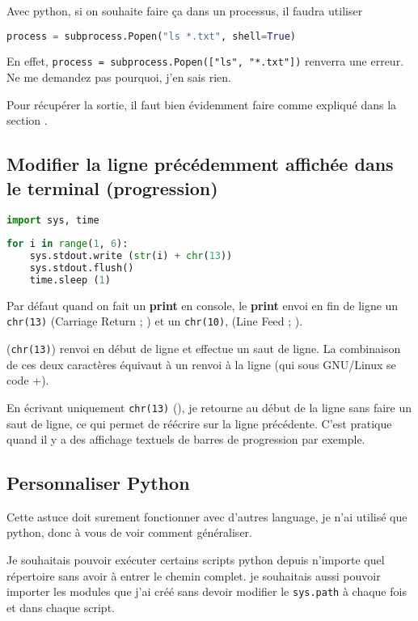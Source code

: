 \documentclass[a4paper,twoside]{article}
\begin{document}
Avec python, si on souhaite faire ça dans un processus, il faudra utiliser
\begin{lstlisting}[language=python]
process = subprocess.Popen("ls *.txt", shell=True)
\end{lstlisting}

En effet, \verb|process = subprocess.Popen(["ls", "*.txt"])| renverra une erreur. Ne me demandez pas pourquoi, j'en sais rien.

\begin{remarque}
Pour récupérer la sortie, il faut bien évidemment faire comme expliqué dans la section .
\end{remarque}

\subsection{Modifier la ligne précédemment affichée dans le terminal (progression)}	
\begin{lstlisting}[language=python]
import sys, time
 
for i in range(1, 6):
    sys.stdout.write (str(i) + chr(13))
    sys.stdout.flush()
    time.sleep (1)
\end{lstlisting}


Par défaut quand on fait un \textbf{print} en console, le \textbf{print} envoi en fin de ligne un \texttt{chr(13)} (Carriage Return ; ) et un \texttt{chr(10)}, (Line Feed ; ).

 (\texttt{chr(13)}) renvoi en début de ligne et  effectue un saut de ligne. La combinaison de ces deux caractères équivaut à un renvoi à la ligne (qui sous GNU/Linux se code +).

En écrivant uniquement \texttt{chr(13)} (), je retourne au début de la ligne sans faire un saut de ligne, ce qui permet de réécrire sur la ligne précédente. C'est pratique quand il y a des affichage textuels de barres de progression par exemple.


\subsection{Personnaliser Python}
Cette astuce doit surement fonctionner avec d'autres language, je  n'ai utilisé que python, donc à vous de voir comment généraliser.

Je souhaitais pouvoir exécuter certains scripts python depuis  n'importe quel répertoire sans avoir à entrer le chemin complet. je  souhaitais aussi pouvoir importer les modules que j'ai créé sans  devoir modifier le \texttt{sys.path} à chaque fois et dans chaque  script.
\end{document}
